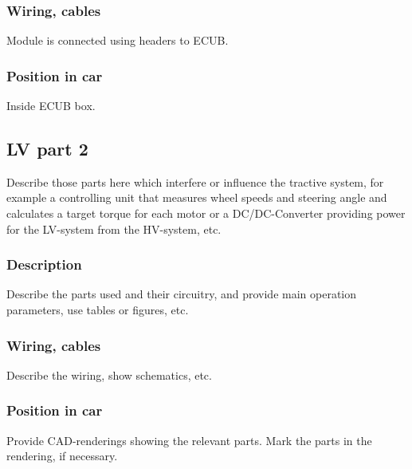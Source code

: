 \subsubsection{Wiring, cables}
Module is connected using headers to ECUB.

\subsubsection{Position in car}
Inside ECUB box.

\subsection{LV part 2}
Describe those parts here which interfere or influence the tractive system, for example a controlling unit that measures wheel speeds and steering angle and calculates a target torque for each motor or a DC/DC-Converter providing power for the LV-system from the HV-system, etc.

\subsubsection{Description}
Describe the parts used and their circuitry, and provide main operation parameters, use tables or figures, etc.

\subsubsection{Wiring, cables}
Describe the wiring, show schematics, etc.

\subsubsection{Position in car}
Provide CAD-renderings showing the relevant parts. Mark the parts in the rendering, if necessary.